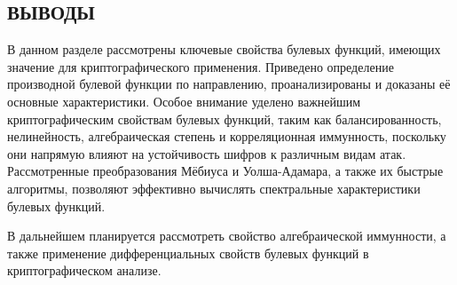 
\subsection*{ВЫВОДЫ}
В данном разделе рассмотрены ключевые свойства булевых функций, имеющих значение для криптографического применения. Приведено определение производной булевой функции по направлению, проанализированы и доказаны её основные характеристики. Особое внимание уделено важнейшим криптографическим свойствам булевых функций, таким как балансированность, нелинейность, алгебраическая степень и корреляционная иммунность, поскольку они напрямую влияют на устойчивость шифров к различным видам атак. Рассмотренные преобразования Мёбиуса и Уолша-Адамара, а также их быстрые алгоритмы, позволяют эффективно вычислять спектральные характеристики булевых функций.

В дальнейшем планируется рассмотреть свойство алгебраической иммунности, а также применение дифференциальных свойств булевых функций в криптографическом анализе.
\newpage 
